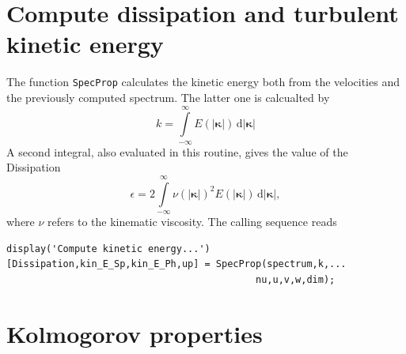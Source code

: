 \documentclass[preprint,12pt,ntfdMod]{elsarticle}
\begin{document}
\section{Compute dissipation and turbulent kinetic energy}

\begin{par}

  The function \lstinline!SpecProp! calculates the kinetic energy both
  from the velocities and the previously computed spectrum. The latter
  one is calcualted by
  \begin{equation}
      k = \int\limits_{-\infty}^{\infty} E(|\boldsymbol\kappa|)\,\mathrm{d}|\boldsymbol\kappa|
  \end{equation}
  A second integral, also evaluated in this routine, gives the value
  of the Dissipation
  \begin{equation}
      \epsilon = 2\int\limits_{-\infty}^{\infty}\nu(|\boldsymbol\kappa|)^2
      E(|\boldsymbol\kappa|)\,\mathrm{d}|\boldsymbol\kappa|,
  \end{equation}
  where $\nu$ refers to the kinematic viscosity.
  The calling sequence reads

\end{par} \vspace{1em}
\begin{lstlisting}
display('Compute kinetic energy...')
[Dissipation,kin_E_Sp,kin_E_Ph,up] = SpecProp(spectrum,k,...
                                            nu,u,v,w,dim);
\end{lstlisting}
\begin{par}



\end{par} \vspace{1em}


\section{Kolmogorov properties}
\end{document}
